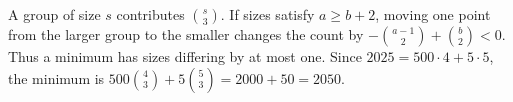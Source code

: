 A group of size $s$ contributes $\binom s3$. If sizes satisfy $a\ge b+2$, moving one point from the larger group to the smaller changes the count by $-\binom{a-1}2+\binom b2<0$. Thus a minimum has sizes differing by at most one. Since $2025=500\cdot4+5\cdot5$, the minimum is $500\binom43+5\binom53=2000+50=\boxed{2050}$.
